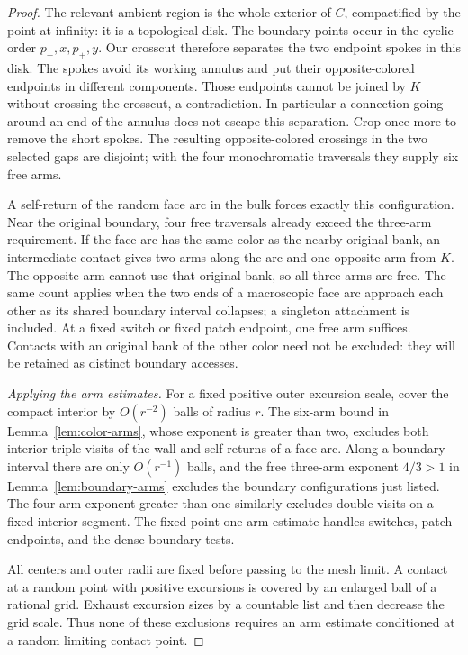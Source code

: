 \begin{proof}
The relevant ambient region is the whole exterior of $C$,
compactified by the point at infinity: it is a topological disk.
The boundary points occur in the cyclic order $p_-,x,p_+,y$.
Our crosscut therefore separates the two endpoint spokes in this
disk.  The spokes avoid its working annulus and put their
opposite-colored endpoints in different components.  Those
endpoints cannot be joined by $K$ without crossing the crosscut,
a contradiction.  In particular a connection going around an end
of the annulus does not escape this separation.  Crop once more
to remove the short spokes.  The resulting opposite-colored
crossings in the two selected gaps are disjoint; with the
four monochromatic traversals they supply six free arms.

A self-return of the random face arc in the bulk forces exactly
this configuration.  Near the original boundary, four free
traversals already exceed the three-arm requirement.  If the face
arc has the same color as the nearby original bank, an intermediate
contact gives two arms along the arc and one opposite arm from $K$.
The opposite arm cannot use that original bank, so all three arms
are free.  The same count applies when the two ends of a macroscopic
face arc approach each other as its shared boundary interval
collapses; a singleton attachment is included.  At a fixed switch
or fixed patch endpoint, one free arm suffices.  Contacts with an
original bank of the other color need not be excluded: they will
be retained as distinct boundary accesses.

\emph{Applying the arm estimates.}
For a fixed positive outer excursion scale, cover the compact
interior by $O(r^{-2})$ balls of radius $r$.  The six-arm bound in
Lemma~\ref{lem:color-arms}, whose exponent is greater than two,
excludes both interior triple visits of the wall and self-returns
of a face arc.  Along a boundary interval there are only
$O(r^{-1})$ balls, and the free three-arm exponent $4/3>1$ in
Lemma~\ref{lem:boundary-arms} excludes the boundary configurations
just listed.  The four-arm exponent greater than one similarly
excludes double visits on a fixed interior segment.  The fixed-point
one-arm estimate handles switches, patch endpoints, and the dense
boundary tests.

All centers and outer radii are fixed before passing to the mesh
limit.  A contact at a random point with positive excursions is
covered by an enlarged ball of a rational grid.  Exhaust excursion
sizes by a countable list and then decrease the grid scale.  Thus
none of these exclusions requires an arm estimate conditioned at a
random limiting contact point.
\end{proof}

